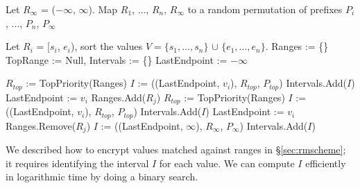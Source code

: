 \begin{framed}
\begin{algorithmic}[1]

  \State Let $R_{\infty}$ = ($-\infty$, $\infty$).
  \State Map $R_1$, $\dots$, $R_n$, $R_{\infty}$ to a random permutation of prefixes $P_i$, $\dots$, $P_n$, $P_{\infty}$
  
  \State Let $R_i$ = [$s_i$, $e_i$), sort the values 
              $V = \{s_1, \dots, s_n\}$ 
              $\cup$ $\{e_1, \dots, e_n\}$.
  \State Ranges := \{\}
  \State TopRange := Null, 
  \State Intervals := \{\}
  \State LastEndpoint := $-\infty$
    
      \State $R_{top}$ := TopPriority(Ranges)
        \State $I$ := ((LastEndpoint, $v_i$), $R_{top}$, $P_{top}$)
        \State Intervals.Add($I$)
        \State LastEndpoint := $v_i$
      \EndIf
      \State Ranges.Add($R_j$) 
    \Else
      \State $R_{top}$ := TopPriority(Ranges)
        \State $I$ := ((LastEndpoint, $v_i$), $R_{top}$, $P_{top}$)
        \State Intervals.Add($I$)
        \State LastEndpoint := $v_i$
      \EndIf
      \State Ranges.Remove($R_j$)
    \EndIf
  \EndFor
  \State $I$ := ((LastEndpoint, $\infty$), $R_{\infty}$, $P_{\infty}$)
  \State Intervals.Add($I$)
  \State {}
\EndProcedure

\end{algorithmic}
\end{framed}

We described how to encrypt values matched against ranges in \S\ref{sec:rmscheme}; it requires identifying the interval $I$ for each value. We can compute $I$ efficiently in logarithmic time by doing a binary search. 


